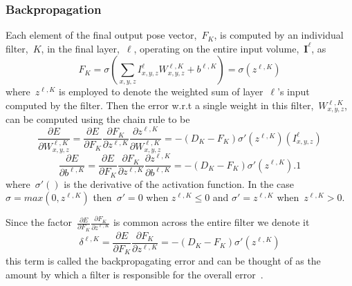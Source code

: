 \documentclass[11pt]{article} %
\begin{document}
\subsubsection{Backpropagation}

Each element of the final output pose vector,~$F_K$, is computed by an individual filter,~$K$, in the final layer,~$\ell$, operating on the entire input volume,~$\boldsymbol I^\ell$, as
\begin{equation}
F_K=\sigma(\sum_{x,y,z}I^{\ell}_{x,y,z}W^{\ell,K}_{x,y,z}+b^{\ell,K})= \sigma(z^{\ell,K})
\end{equation}
where~$z^{\ell,K}$ is employed to denote the weighted sum of layer~$\ell$'s input computed by the filter. Then the error w.r.t a single weight in this filter,~$W^{\ell,K}_{x,y,z}$, can be computed using the chain rule to be~\cite{UFLDL}
\begin{equation}
\frac{\partial E}{\partial W^{\ell,K}_{x,y,z}}= \frac{\partial E}{\partial F_{K}}\frac{\partial F_K}{\partial z^{\ell,K}}\frac{\partial z^{\ell,K}}{\partial W^{\ell,K}_{x,y,z}}=-(D_K-F_K)\sigma'(z^{\ell,K}) (I^{\ell}_{x,y,z})
\end{equation}
\begin{equation}
\frac{\partial E}{\partial b^{\ell,K}}=  \frac{\partial E}{\partial F_{K}}\frac{\partial F_K}{\partial z^{\ell,K}}\frac{\partial z^{\ell,K}}{\partial b^{\ell,K}}=-(D_K-F_K)\sigma'(z^{\ell,K}).1
\end{equation}
where~$\sigma'()$ is the derivative of the activation function. In the case~$\sigma=max(0,z^{\ell,K})$ then~$\sigma'=0$ when $z^{\ell,K}\le 0$ and  $\sigma'=z^{\ell,K}$ when~$z^{\ell,K}>0$. 

Since the factor~$ \frac{\partial E}{\partial F_{K}}\frac{\partial F_K}{\partial z^{\ell,K}}$ is common across the entire filter we denote it 
\begin{equation}
\delta^{\ell,K}= \frac{\partial E}{\partial F_{K}}\frac{\partial F_K}{\partial z^{\ell,K}}=-(D_K-F_K)\sigma'(z^{\ell,K})
\end{equation}
this term is called the backpropagating error and can be thought of as the amount by which a filter is responsible for the overall error~\cite{UFLDL}.
\end{document}

